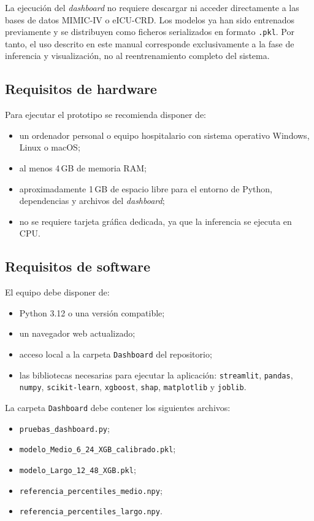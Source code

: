 \documentclass[
  spanish,
  a4paper,
  12pt,
  twoside]{memoir}
\begin{document}
La ejecución del \textit{dashboard} no requiere descargar ni acceder directamente a las bases de datos MIMIC-IV o eICU-CRD. Los modelos ya han sido entrenados previamente y se distribuyen como 
ficheros serializados en formato \texttt{.pkl}. Por tanto, el uso descrito en este manual corresponde exclusivamente a la fase de inferencia y visualización, no al reentrenamiento completo 
del sistema.

\subsection*{Requisitos de hardware}

Para ejecutar el prototipo se recomienda disponer de:

\begin{itemize}
  \item un ordenador personal o equipo hospitalario con sistema operativo Windows, Linux o macOS;
  \item al menos 4\,GB de memoria RAM;
  \item aproximadamente 1\,GB de espacio libre para el entorno de Python, dependencias y archivos del \textit{dashboard};
  \item no se requiere tarjeta gráfica dedicada, ya que la inferencia se ejecuta en CPU.
\end{itemize}

\subsection*{Requisitos de software}

El equipo debe disponer de:

\begin{itemize}
  \item Python 3.12 o una versión compatible;
  \item un navegador web actualizado;
  \item acceso local a la carpeta \texttt{Dashboard} del repositorio;
  \item las bibliotecas necesarias para ejecutar la aplicación: \texttt{streamlit}, \texttt{pandas}, \texttt{numpy}, \texttt{scikit-learn}, \texttt{xgboost}, \texttt{shap}, \texttt{matplotlib} y \texttt{joblib}.
\end{itemize}

La carpeta \texttt{Dashboard} debe contener los siguientes archivos:

\begin{itemize}
  \item \texttt{pruebas\_dashboard.py};
  \item \texttt{modelo\_Medio\_6\_24\_XGB\_calibrado.pkl};
  \item \texttt{modelo\_Largo\_12\_48\_XGB.pkl};
  \item \texttt{referencia\_percentiles\_medio.npy};
  \item \texttt{referencia\_percentiles\_largo.npy}.
\end{itemize}
\end{document}
